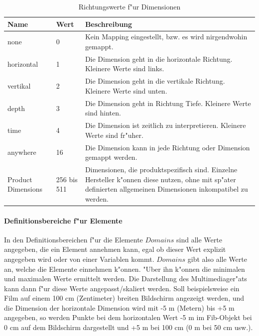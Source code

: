 \begin{table}[htbp]
\begin{center}
\begin{tabular}{|p{35mm}|p{10mm}|p{75mm}|}\hline
	Name & Wert & Beschreibung \\\hline\hline
	none & 0 & Kein Mapping eingestellt, bzw. es wird nirgendwohin gemappt. \\\hline
	horizontal & 1 & Die Dimension geht in die horizontale Richtung. Kleinere Werte sind links. \\\hline
	vertikal & 2 & Die Dimension geht in die vertikale Richtung. Kleinere Werte sind unten. \\\hline
	depth & 3 & Die Dimension geht in Richtung Tiefe. Kleinere Werte sind hinten. \\\hline
	time & 4 & Die Dimension ist zeitlich zu interpretieren. Kleinere Werte sind fr"uher.\\\hline
	anywhere & 16 & Die Dimension kann in jede Richtung oder Dimension gemappt werden.\\\hline

	Product Dimensions & 256 bis 511 & Dimensionen, die produktspezifisch sind. Einzelne Hersteller k"onnen diese nutzen, ohne mit sp"ater definierten allgemeinen Dimensionen inkompatibel zu werden. \\\hline


\end{tabular} 
\end{center}
\caption{Richtungswerte f"ur Dimensionen}
\label{tableDimmapValues}
\end{table}




\paragraph{Definitionsbereiche f"ur Elemente}
\label{secDomainsForElements}

In den Definitionsbereichen f"ur die Elemente $Domains$ sind alle Werte angegeben, die ein Element annehmen kann, egal ob dieser Wert explizit angegeben wird oder von einer Variablen kommt. $Domains$ gibt also alle Werte an, welche die Elemente einnehmen k"onnen. "Uber ihn k"onnen die minimalen und maximalen Werte ermittelt werden. Die Darstellung des Multimediager"ats kann dann f"ur diese Werte angepasst/skaliert werden. Soll beispielsweise ein Film auf einem 100 cm (Zentimeter) breiten Bildschirm angezeigt werden, und die Dimension der horizontale Dimension wird mit -5 m (Metern) bis +5 m angegeben, so werden Punkte bei dem horizontalen Wert -5 m im Fib-Objekt bei 0 cm auf dem Bildschirm dargestellt und +5 m bei 100 cm (0 m bei 50 cm usw.).

